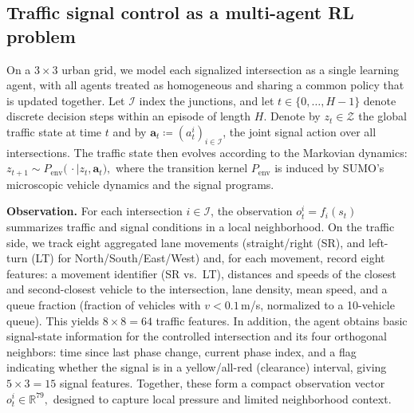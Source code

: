 \documentclass{ifacconf}
\newcommand{\1}{\mbox{1}\hspace{-0.25em}\mbox{l}}
\begin{document}
\subsection{Traffic signal control as a multi-agent RL problem}
\label{subsec:marl-setting}


On a $3\times3$ urban grid, we model each signalized intersection as a single learning agent, with all agents treated as homogeneous and sharing a common policy that is updated together.
Let $\mathcal{I}$ index the junctions, and let 
$t \in \{0,\dots,H-1\}$ denote discrete decision steps within an episode of length $H$. 
Denote by $z_t \in \mathcal{Z}$ the global traffic state at time $t$ and by 
$\mathbf{a}_t \coloneqq (a_t^i)_{i \in \mathcal{I}}$, the joint signal action over all intersections. 
The traffic state then evolves according to the Markovian dynamics:
$
z_{t+1} \sim 
P_{\mathrm{env}}\bigl(\,\cdot \mid z_t, \mathbf{a}_t \bigr),
$
where the transition kernel $P_{\mathrm{env}}$ is induced by \textsc{SUMO}'s microscopic vehicle dynamics and the signal programs.


\textbf{Observation.} For each intersection $i \in \mathcal{I}$, the observation $o_t^i = f_i(s_t)$ summarizes traffic and signal conditions in a local neighborhood. On the traffic side, we track eight aggregated lane movements (straight/right (SR), and left-turn (LT) for North/South/East/West) and, for each movement, record eight features: a movement identifier (SR vs.\ LT), distances and speeds of the closest and second-closest vehicle to the intersection, lane density, mean speed, and a queue fraction (fraction of vehicles with $v < 0.1$\,\si{m/s}, normalized to a 10-vehicle queue). This yields $8\times 8 = 64$ traffic features. In addition, the agent obtains basic signal-state information for the controlled intersection and its four orthogonal neighbors: time since last phase change, current phase index, and a flag indicating whether the signal is in a yellow/all-red (clearance) interval, giving $5\times 3 = 15$ signal features. Together, these form a compact observation vector
\(
o_t^i \in \mathbb{R}^{79},
\)
designed to capture local pressure and limited neighborhood context.
\end{document}
